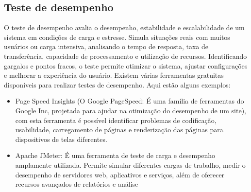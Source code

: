 \documentclass[12pt]{article}
\begin{document}
\subsection{Teste de desempenho}
O teste de desempenho avalia o desempenho, estabilidade e escalabilidade de um sistema em condições de carga e estresse. Simula situações reais com muitos usuários ou carga intensiva, analisando o tempo de resposta, taxa de transferência, capacidade de processamento e utilização de recursos. Identificando gargalos e pontos fracos, o teste permite otimizar o sistema, ajustar configurações e melhorar a experiência do usuário. Existem várias ferramentas gratuitas disponíveis para realizar testes de desempenho. Aqui estão alguns exemplos:
\begin{itemize}
   \item Page Speed Insights (O Google PageSpeed: É
uma família de ferramentas do Google Inc, projetada para ajudar na otimização do
desempenho de um site), com esta ferramenta é possível identificar problemas de
codificação, usabilidade, carregamento de páginas e renderização das páginas para
dispositivos de telas diferentes. 
\item Apache JMeter: É uma ferramenta de teste de carga e desempenho amplamente utilizada. Permite simular diferentes cargas de trabalho, medir o desempenho de servidores web, aplicativos e serviços, além de oferecer recursos avançados de relatórios e análise
 \end{itemize}
 
\end{document}
